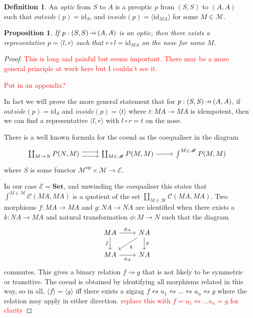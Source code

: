 \documentclass[11pt,a4paper]{article}
\theoremstyle{plain}
\newtheorem{proposition}[theorem]{Proposition}
\theoremstyle{definition}
\newtheorem{definition}[theorem]{Definition}
\newcommand{\C}{\mathscr{C}}
\newcommand{\E}{\mathscr{E}}
\newcommand{\M}{\mathscr{M}}
\newcommand{\Set}{\mathbf{Set}}
\newcommand{\id}{\mathrm{id}}
\newcommand{\op}{\mathrm{op}}
\newcommand{\hto}{\ensuremath{\,\mathaccent\shortmid\rightarrow\,}}
\newcommand{\todo}[1]{\textcolor{red}{\small #1}}
\begin{document}
\begin{definition}
An \emph{optic} from $S$ to $A$ is a preoptic $p$ from $(S, S)$ to $(A, A)$ such that $outside(p) = \id_S$, and $inside(p) = \langle \id_{MA} \rangle$ for some $M \in \M$.
\end{definition}

\begin{proposition}
\label{prop-onthenose}
If $p : (S,S) \hto (A,A)$ is an optic, then there exists a representative $p = \langle l, r \rangle$ such that $r \circ l = \id_{MA}$ on the nose for some $M$.
\end{proposition}
\begin{proof}
\todo{This is long and painful but seems important. There may be a more general principle at work here but I couldn't see it.}

\todo{Put in an appendix?}

In fact we will prove the more general statement that for $p : (S,S) \hto (A,A)$, if $outside(p) = \id_S$ and $inside(p) = \langle t \rangle$ where $t : MA \to MA$ is idempotent, then we can find a representative $\langle l, r \rangle$ with $l \circ r = t$ on the nose.

There is a well known formula for the coend as the coequaliser in the diagram
\[
\begin{tikzcd}
\coprod_{M \to N} P(N, M) \ar[r,shift left=.75ex]  \ar[r,shift right=.75ex] & \coprod_{M \in \M} P(M, M) \ar[r] & \int^{M \in \M} P(M, M)
\end{tikzcd}
\]
where $S$ is some functor $\M^\op \times \M \to \E$.

In our case $\E = \Set$, and unwinding the coequaliser this states that $\int^{M \in \M} \C(M A, M A)$ is a quotient of the set $\coprod_{M \in \M} \C(M A, M A)$. Two morphisms $f : M A \to M A$ and $g : N A \to N A$ are identified when there exists a $k : N A \to M A$ and natural transformation $\phi : M \to N$ such that the diagram
\[
\begin{tikzcd}
M A \ar[r, "\phi_A"] \ar[d, "f", swap] & N A \ar[d, "g"] \ar[dl, "k"] \\
M A \ar[r, "\phi_A", swap] & N A
\end{tikzcd}
\]
commutes. This gives a binary relation $f \rightsquigarrow g$ that is not likely to be symmetric or transitive. The coend is obtained by identifying all morphisms related in this way, so in all, $\langle f \rangle = \langle g \rangle$ iff there exists a zigzag $f \leftrightsquigarrow u_1 \leftrightsquigarrow \dots \leftrightsquigarrow u_n \leftrightsquigarrow g$ where the relation may apply in either direction. \todo{replace this with $f = u_1 \leftrightsquigarrow \dots u_n = g$ for clarity}


\end{proof}
\end{document}
